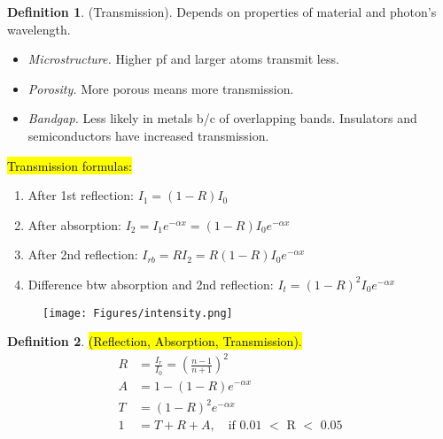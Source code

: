 \documentclass{article}
\theoremstyle{definition}
\newtheorem{definition}{Definition}[section]
\begin{document}
\begin{definition}
    (Transmission). Depends on properties of material and photon's wavelength.
    \begin{itemize}
        \item \textit{Microstructure.} Higher pf and larger atoms transmit less.
        \item \textit{Porosity.} More porous means more transmission.
        \item \textit{Bandgap.} Less likely in metals b/c of overlapping bands. Insulators and semiconductors have increased transmission.
    \end{itemize}
    \hl{Transmission formulas:}
    \begin{enumerate}
        \item After 1st reflection: $I_1 = (1-R)I_0$
        \item After absorption: $I_2 = I_1 e^{-\alpha x} = (1-R) I_0 e^{-\alpha x}$
        \item After 2nd reflection: $I_{rb} = RI_2 = R(1-R)I_0 e^{-\alpha x}$
        \item Difference btw absorption and 2nd reflection: $I_t = (1-R)^2 I_0 e^{-\alpha x}$
    \end{enumerate}
    \begin{figure}[ht]
        \centering
        \texttt{[image: Figures/intensity.png]}
    \end{figure}
\end{definition}

\begin{definition}
    \hl{(Reflection, Absorption, Transmission).}
    \begin{align}
        R &= \frac{I_r}{I_0} = \left( \frac{n-1}{n+1} \right)^2 \\
        A &= 1 - (1-R) e^{-\alpha x} \\
        T &= (1-R)^2 e^{-\alpha x} \\
        1 &= T + R + A, \quad \text{if 0.01 $<$ R $<$ 0.05}
    \end{align}
\end{definition}
\end{document}
